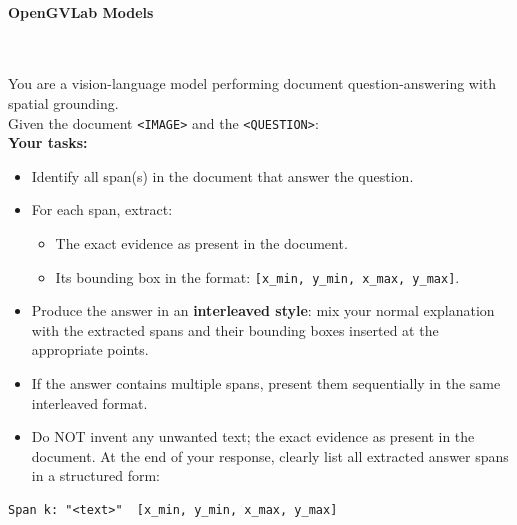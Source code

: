 \paragraph{OpenGVLab Models}\mbox{}\\[4pt]


\begin{tcolorbox}[baseline_prompt_style, title=InternVL3.5 8B \cite{wang2025internvl3_5}]

You are a vision-language model performing document question-answering with spatial grounding. \\

Given the document \texttt{<IMAGE>} and the \texttt{<QUESTION>}: \\

\textbf{Your tasks: }
\begin{itemize}[leftmargin=10pt]   
    \item Identify all span(s) in the document that answer the question. 

    \item For each span, extract:
    \begin{itemize}
        \item The exact evidence as present in the document.
        \item Its bounding box in the format: \texttt{[x\_min, y\_min, x\_max, y\_max]}.
    \end{itemize}

    \item Produce the answer in an \textbf{interleaved style}: mix your normal explanation with the extracted spans and their bounding boxes inserted at the appropriate points.

    \item If the answer contains multiple spans, present them sequentially in the same interleaved format.

    \item Do NOT invent any unwanted text; the exact evidence as present in the document. At the end of your response, clearly list all extracted answer spans in a structured form:

\end{itemize}

\begin{verbatim}
Span k: "<text>"  [x_min, y_min, x_max, y_max]
\end{verbatim}
\end{tcolorbox}



